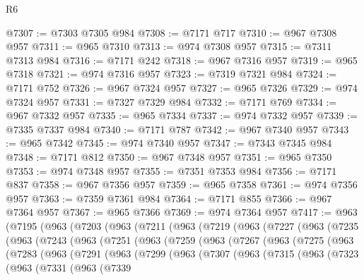 \begin{lexlean}{R6}
\begin{coremodule}
@7307 := @7303 @7305 @984
@7308 := @7171 @717
@7310 := @967 @7308 @957
@7311 := @965 @7310
@7313 := @974 @7308 @957
@7315 := @7311 @7313 @984
@7316 := @7171 @242
@7318 := @967 @7316 @957
@7319 := @965 @7318
@7321 := @974 @7316 @957
@7323 := @7319 @7321 @984
@7324 := @7171 @752
@7326 := @967 @7324 @957
@7327 := @965 @7326
@7329 := @974 @7324 @957
@7331 := @7327 @7329 @984
@7332 := @7171 @769
@7334 := @967 @7332 @957
@7335 := @965 @7334
@7337 := @974 @7332 @957
@7339 := @7335 @7337 @984
@7340 := @7171 @787
@7342 := @967 @7340 @957
@7343 := @965 @7342
@7345 := @974 @7340 @957
@7347 := @7343 @7345 @984
@7348 := @7171 @812
@7350 := @967 @7348 @957
@7351 := @965 @7350
@7353 := @974 @7348 @957
@7355 := @7351 @7353 @984
@7356 := @7171 @837
@7358 := @967 @7356 @957
@7359 := @965 @7358
@7361 := @974 @7356 @957
@7363 := @7359 @7361 @984
@7364 := @7171 @855
@7366 := @967 @7364 @957
@7367 := @965 @7366
@7369 := @974 @7364 @957
@7417 := @963
    (@7195
      (@963
        (@7203
          (@963
            (@7211
              (@963
                (@7219
                  (@963
                    (@7227
                      (@963
                        (@7235
                          (@963
                            (@7243
                              (@963
                                (@7251
                                  (@963
                                    (@7259
                                      (@963
                                        (@7267
                                          (@963
                                            (@7275
                                              (@963
                                                (@7283
                                                  (@963
                                                    (@7291
                                                      (@963
                                                        (@7299
                                                          (@963
                                                            (@7307
                                                              (@963
                                                                (@7315
                                                                  (@963
                                                                    (@7323
                                                                      (@963
                                                                        (@7331
                                                                          (@963
                                                                            (@7339

\end{coremodule}
\end{lexlean}
